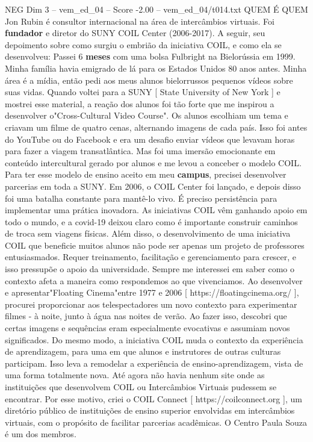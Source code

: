 \begin{textsample}{NEG Dim 3 – vem\_ed\_04 – Score -2.00 – vem\_ed\_04/t014.txt}  \label{ex:f3_neg_008}
QUEM É QUEM Jon Rubin é consultor internacional na área de intercâmbios virtuais.
Foi \textbf{fundador} e diretor do SUNY COIL Center (2006-2017).
A seguir, seu depoimento sobre como surgiu o embrião da iniciativa COIL, e como ela se desenvolveu: Passei 6 \textbf{meses} com uma bolsa Fulbright na Bielorússia em 1999.
Minha família havia emigrado de lá para os Estados Unidos 80 anos antes.
Minha área é a mídia, então pedi aos meus alunos bielorrussos pequenos vídeos sobre suas vidas.
Quando voltei para a SUNY [ State University of New York ] e mostrei esse material, a reação dos alunos foi tão forte que me inspirou a desenvolver o"Cross-Cultural Video Course".
Os alunos escolhiam um tema e criavam um filme de quatro cenas, alternando imagens de cada país.
Isso foi antes do YouTube ou do Facebook e era um desafio enviar vídeos que levavam horas para fazer a viagem transatlântica.
Mas foi uma imersão emocionante em conteúdo intercultural gerado por alunos e me levou a conceber o modelo COIL.
Para ter esse modelo de ensino aceito em meu \textbf{campus}, precisei desenvolver parcerias em toda a SUNY.
Em 2006, o COIL Center foi lançado, e depois disso foi uma batalha constante para mantê-lo vivo.
É preciso persistência para implementar uma prática inovadora.
As iniciativas COIL vêm ganhando apoio em todo o mundo, e a covid-19 deixou claro como é importante construir caminhos de troca sem viagens físicas.
Além disso, o desenvolvimento de uma iniciativa COIL que beneficie muitos alunos não pode ser apenas um projeto de professores entusiasmados.
Requer treinamento, facilitação e gerenciamento para crescer, e isso pressupõe o apoio da universidade.
Sempre me interessei em saber como o contexto afeta a maneira como respondemos ao que vivenciamos.
Ao desenvolver e apresentar"Floating Cinema"entre 1977 e 2006 [ https://floatingcinema.org/ ], procurei proporcionar aos telespectadores um novo contexto para experimentar filmes - à noite, junto à água nas noites de verão.
Ao fazer isso, descobri que certas imagens e sequências eram especialmente evocativas e assumiam novos significados.
Do mesmo modo, a iniciativa COIL muda o contexto da experiência de aprendizagem, para uma em que alunos e instrutores de outras culturas participam.
Isso leva a remodelar a experiência de ensino-aprendizagem, vista de uma forma totalmente nova.
Até agora não havia nenhum site onde as instituições que desenvolvem COIL ou Intercâmbios Virtuais pudessem se encontrar.
Por esse motivo, criei o COIL Connect [ https://coilconnect.org ], um diretório público de instituições de ensino superior envolvidas em intercâmbios virtuais, com o propósito de facilitar parcerias acadêmicas.
O Centro Paula Souza é um dos membros.

\end{textsample}
